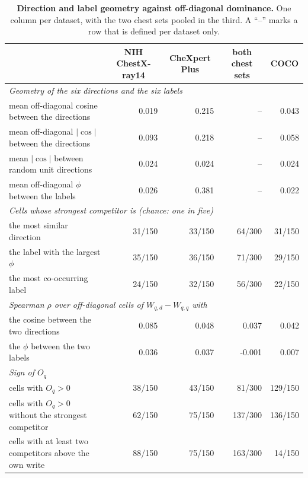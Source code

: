 \begin{table}[h]
\centering
\scriptsize
\setlength{\tabcolsep}{5pt}
\caption{\textbf{Direction and label geometry against off-diagonal dominance.} One column per dataset, with the two chest sets pooled in the third. A ``--'' marks a row that is defined per dataset only.}
\label{tab:cf-geometry}
\begin{tabular}{lrrrr}
\toprule
& \multicolumn{1}{c}{NIH ChestX-ray14} & \multicolumn{1}{c}{CheXpert Plus} & \multicolumn{1}{c}{both chest sets} & \multicolumn{1}{c}{COCO}\\
\midrule
\multicolumn{5}{l}{\textit{Geometry of the six directions and the six labels}} \\
\quad mean off-diagonal cosine between the directions & 0.019 & 0.215 & -- & 0.043 \\
\quad mean off-diagonal $|\cos|$ between the directions & 0.093 & 0.218 & -- & 0.058 \\
\quad mean $|\cos|$ between random unit directions & 0.024 & 0.024 & -- & 0.024 \\
\quad mean off-diagonal $\phi$ between the labels & 0.026 & 0.381 & -- & 0.022 \\
\midrule
\multicolumn{5}{l}{\textit{Cells whose strongest competitor is (chance: one in five)}} \\
\quad the most similar direction & 31/150 & 33/150 & 64/300 & 31/150 \\
\quad the label with the largest $\phi$ & 35/150 & 36/150 & 71/300 & 29/150 \\
\quad the most co-occurring label & 24/150 & 32/150 & 56/300 & 22/150 \\
\midrule
\multicolumn{5}{l}{\textit{Spearman $\rho$ over off-diagonal cells of $W_{q,d}-W_{q,q}$ with}} \\
\quad the cosine between the two directions & 0.085 & 0.048 & 0.037 & 0.042 \\
\quad the $\phi$ between the two labels & 0.036 & 0.037 & -0.001 & 0.007 \\
\midrule
\multicolumn{5}{l}{\textit{Sign of $O_q$}} \\
\quad cells with $O_q>0$ & 38/150 & 43/150 & 81/300 & 129/150 \\
\quad cells with $O_q>0$ without the strongest competitor & 62/150 & 75/150 & 137/300 & 136/150 \\
\quad cells with at least two competitors above the own write & 88/150 & 75/150 & 163/300 & 14/150 \\
\bottomrule
\end{tabular}
\end{table}
